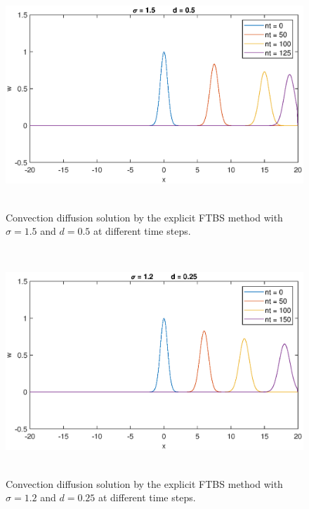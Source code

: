 \documentclass[letterpaper,12pt]{article}
\begin{document}
\begin{figure}[!ht] 
	\centering 
	\includegraphics[max height=8.5cm]{graphs/FTBS/ConvectionDiffusion/sigma15d05.eps}
	\caption{Convection diffusion solution by the explicit FTBS method with $\sigma= 1.5$ and $d=0.5$ at different time steps.}
	 \label{fig:FTBSsigma15d05}
\end{figure}
\begin{figure}[!ht] 
	\centering 
	\includegraphics[max height=8.5cm]{graphs/FTBS/ConvectionDiffusion/sigma12d025.eps}
	\caption{Convection diffusion solution by the explicit FTBS method with $\sigma= 1.2$ and $d=0.25$ at different time steps.}
	 \label{fig:FTBSsigma12d025}
\end{figure}
\newpage
\end{document}
